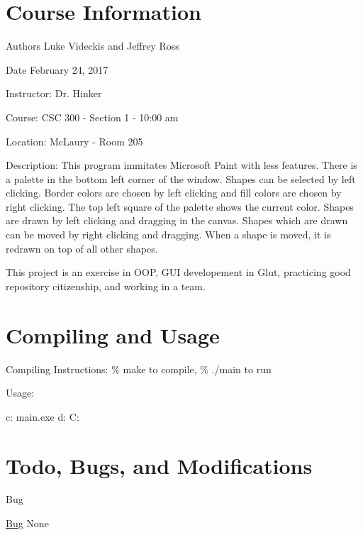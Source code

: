 \hypertarget{index_course_section}{}\section{Course Information}\label{index_course_section}
\begin{DoxyAuthor}{Authors}
Luke Videckis and Jeffrey Ross
\end{DoxyAuthor}
\begin{DoxyDate}{Date}
February 24, 2017
\end{DoxyDate}
\begin{DoxyParagraph}{Instructor\-:}
Dr. Hinker
\end{DoxyParagraph}
\begin{DoxyParagraph}{Course\-:}
C\-S\-C 300 -\/ Section 1 -\/ 10\-:00 am
\end{DoxyParagraph}
\begin{DoxyParagraph}{Location\-:}
Mc\-Laury -\/ Room 205
\end{DoxyParagraph}
\begin{DoxyParagraph}{Description\-:}
This program immitates Microsoft Paint with less features. There is a palette in the bottom left corner of the window. Shapes can be selected by left clicking. Border colors are chosen by left clicking and fill colors are chosen by right clicking. The top left square of the palette shows the current color. Shapes are drawn by left clicking and dragging in the canvas. Shapes which are drawn can be moved by right clicking and dragging. When a shape is moved, it is redrawn on top of all other shapes.\par
\par
 This project is an exercise in O\-O\-P, G\-U\-I developement in Glut, practicing good repository citizenship, and working in a team.
\end{DoxyParagraph}
\hypertarget{index_compile_section}{}\section{Compiling and Usage}\label{index_compile_section}
\begin{DoxyParagraph}{Compiling Instructions\-:}
\% make to compile, \% ./main to run
\end{DoxyParagraph}
\begin{DoxyParagraph}{Usage\-:}
\begin{DoxyVerb}  c:\> main.exe
  d:\> C:\end{DoxyVerb}

\end{DoxyParagraph}
\hypertarget{index_todo_bugs_modification_section}{}\section{Todo, Bugs, and Modifications}\label{index_todo_bugs_modification_section}
\begin{DoxyRefDesc}{Bug}
\item[\hyperlink{bug__bug000001}{Bug}]None\end{DoxyRefDesc}


